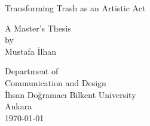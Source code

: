 \documentclass[12pt]{report}
\begin{document}
\begin{titlepage}
    \begin{center}
        
        \Huge
        Transforming Trash as an Artistic Act
        
        \vfill
        \Large
        A Master’s Thesis\\
        by\\
        Mustafa İlhan
        
        \vfill
        Department of\\
        Communication and Design\\
        İhsan Doğramacı Bilkent University\\
        Ankara\\
        \today
        
    \end{center}
\end{titlepage}





\end{document}
